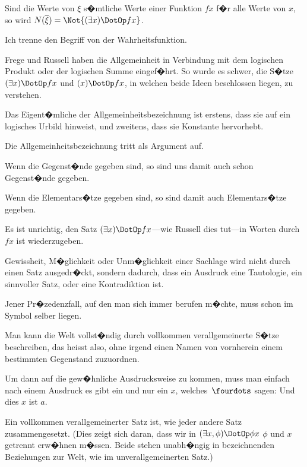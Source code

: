 \begin{propositions}
{Sind die Werte von $\xi$ s�mtliche Werte einer
Funktion $fx$ f�r alle Werte von $x$, so wird
$N(\overline{\xi}) = \Not{(\exists x) \DotOp fx}$.}


{Ich trenne den Begriff  von der Wahrheitsfunktion.

Frege und Russell haben die Allgemeinheit in
Verbindung mit dem logischen Produkt oder der
logischen Summe eingef�hrt. So wurde es schwer,
die S�tze \glqq{}$(\exists x) \DotOp fx$\grqq{} und \glqq{}$(x) \DotOp fx$\grqq{}, in welchen beide
Ideen beschlossen liegen, zu verstehen.}


{Das Eigent�mliche der Allgemeinheitsbezeichnung
ist erstens, dass sie auf ein logisches Urbild
hinweist, und zweitens, dass sie Konstante
hervorhebt.}


{Die Allgemeinheitsbezeichnung tritt als Argument
auf.}


{Wenn die Gegenst�nde gegeben sind, so sind
uns damit auch schon  Gegenst�nde gegeben.

Wenn die Elementars�tze gegeben sind, so sind
damit auch  Elementars�tze gegeben.}


{Es ist unrichtig, den Satz \glqq{}$(\exists x) \DotOp fx$\grqq{}---wie
Russell dies tut---in Worten durch \glqq{}$fx$ ist \grqq{}
wiederzugeben.

Gewissheit, M�glichkeit oder Unm�glichkeit
einer Sachlage wird nicht durch einen Satz ausgedr�ckt,
sondern dadurch, dass ein Ausdruck eine
Tautologie, ein sinnvoller Satz, oder eine Kontradiktion
ist.

Jener Pr�zedenzfall, auf den man sich immer
berufen m�chte, muss schon im Symbol selber
liegen.}


{Man kann die Welt vollst�ndig durch vollkommen
verallgemeinerte S�tze beschreiben, das
heisst also, ohne irgend einen Namen von vornherein
einem bestimmten Gegenstand zuzuordnen.

Um dann auf die gew�hnliche Ausdrucksweise
zu kommen, muss man einfach nach einem Ausdruck
\glqq{}es gibt ein und nur ein $x$, welches~$\fourdots$\grqq{} sagen:
Und dies $x$ ist $a$.}


{Ein vollkommen verallgemeinerter Satz ist, wie
jeder andere Satz zusammengesetzt. (Dies zeigt
sich daran, dass wir in \glqq{}$(\exists x, \phi) \DotOp \phi x$\grqq{} \glqq{}$\phi$\grqq{} und \glqq{}$x$\grqq{}
getrennt erw�hnen m�ssen. Beide stehen unabh�ngig
in bezeichnenden Beziehungen zur Welt,
wie im unverallgemeinerten Satz.)

}
\end{propositions}
